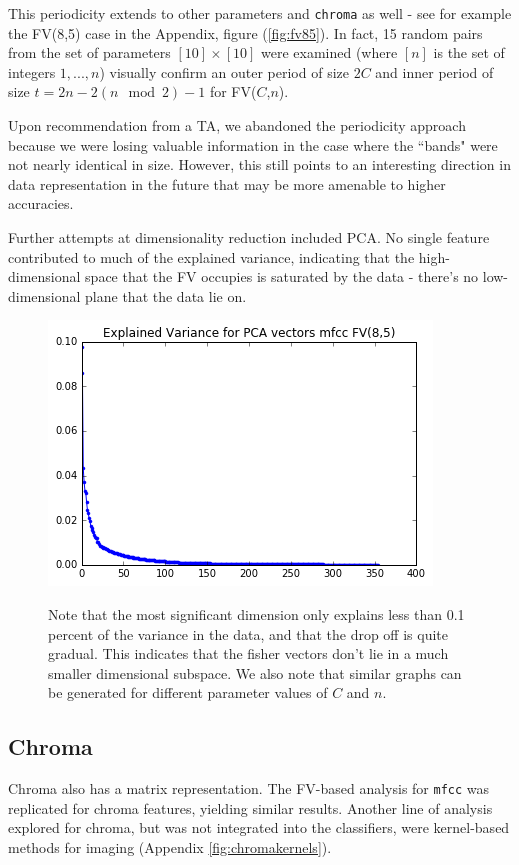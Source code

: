 \documentclass[9pt]{article}
\begin{document}
This periodicity extends to other parameters and \texttt{chroma} as well - see for example the FV(8,5) case in the Appendix, figure (\ref{fig:fv85}). In fact, 15 random pairs from the set of parameters $[10]\times[10]$ were examined (where $[n]$ is the set of integers $1, ..., n$) visually confirm an outer period of size $2C$ and inner period of size $t=2n-2(n\mod 2)-1$ for FV($C$,$n$).

Upon recommendation from a TA, we abandoned the periodicity approach because we were losing valuable information in the case where the ``bands" were not nearly identical in size. However, this still points to an interesting direction in data representation in the future that may be more amenable to higher accuracies.

Further attempts at dimensionality reduction included PCA. No single feature contributed to much of the explained variance, indicating that the high-dimensional space that the FV occupies is saturated by the data - there's no low-dimensional plane that the data lie on.

\begin{figure}[H]
    \centering
    \includegraphics[scale=0.3]{pca-mfcc8-5.png}
    \label{fig:pca}
    \caption{Note that the most significant dimension only explains less than 0.1 percent of the variance
    in the data, and that the drop off is quite gradual.
    This indicates that the fisher vectors don't lie in a much smaller dimensional subspace.
    We also note that similar graphs can be generated for different parameter values of $C$ and $n$.}
\end{figure}


\subsection{Chroma}

Chroma also has a matrix representation. The FV-based analysis for \texttt{mfcc} was replicated for chroma features, yielding similar results. Another line of analysis explored for chroma, but was not integrated into the classifiers, were kernel-based methods for imaging (Appendix \ref{fig:chromakernels}).
\end{document}
